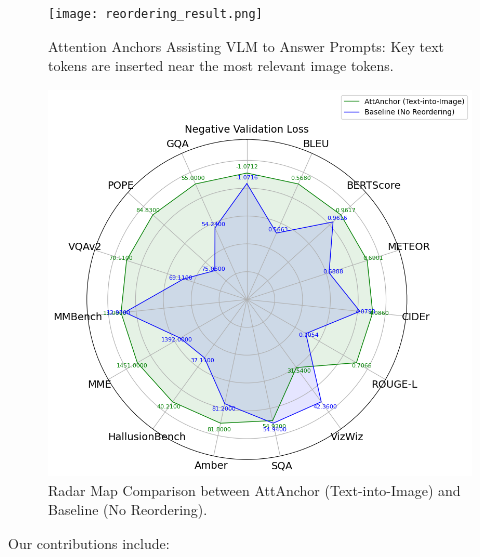 \documentclass[11pt]{article}
\begin{document}
\begin{figure}[H]
    \centering
    \begin{minipage}{0.48\textwidth}
        \centering       \texttt{[image: reordering\_result.png]}
        \caption{Attention Anchors Assisting VLM to Answer Prompts: Key text tokens are inserted near the most relevant image tokens.}
        \label{fig:visual}
    \end{minipage}
    \hfill
    \begin{minipage}{0.51\textwidth}
        \centering        \includegraphics[width=\linewidth]{radar.png}
        \caption{Radar Map Comparison between AttAnchor (Text-into-Image) and Baseline (No Reordering).}
        \label{fig:radar}
    \end{minipage}
\end{figure}
\vspace{-0.5cm}
Our contributions include:
\end{document}
